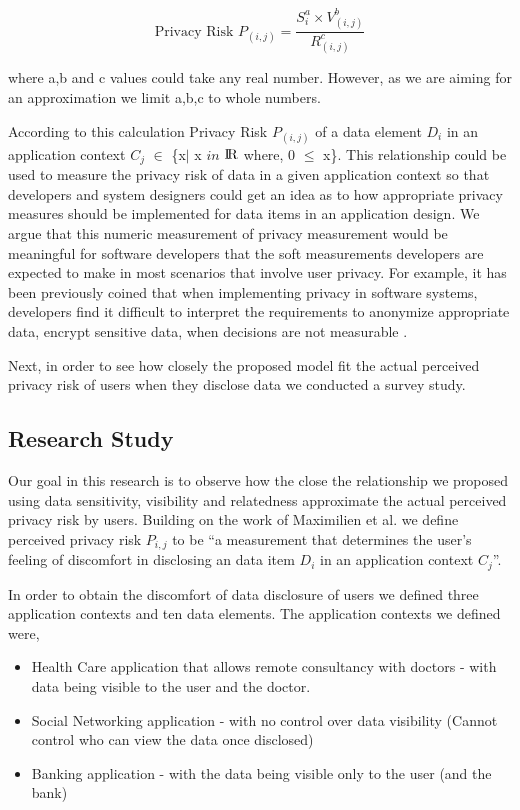 \documentclass[10pt]{article}
\begin{document}
\[
\text {Privacy Risk $P_{(i,j)}$} =\frac{S_{i}^a \times V_{(i,j)}^b}{R_{(i,j)}^ c}
\]

where a,b and c values could take any real number. However, as we are aiming for an approximation we limit a,b,c to whole numbers.

According to this calculation Privacy Risk $P_{(i,j)}$  of a data element \textit {$D_i$} in an application context \textit {$C_j$} $\in$ \{x$\mid$ x $in$ ${\rm I\!R}$ where, 0 $\leq$ x\}. This relationship could be used to measure the privacy risk of data in a given application context so that developers and system designers could get an idea as to how appropriate privacy measures should be implemented for data items in an application design. We argue that this numeric measurement of privacy measurement would be meaningful for software developers that the soft measurements developers are expected to make in most scenarios that involve user privacy. For example, it has been previously coined that when implementing privacy in software systems, developers find it difficult to interpret the requirements to anonymize appropriate data, encrypt sensitive data, when decisions are not measurable \cite {senarath2018why}. 



Next, in order to see how closely the proposed model fit the actual perceived privacy risk of users when they disclose data we conducted a survey study.

\subsection {Research Study}

Our goal in this research is to observe how the close the relationship we proposed using data sensitivity, visibility and relatedness approximate the actual perceived privacy risk by users. Building on the work of Maximilien et al. \cite {maximilien2009privacy} we define perceived privacy risk $P_{i,j}$ to be \enquote{a measurement that determines the user's feeling of discomfort in disclosing an data item \textit {$D_i$} in an application context \textit {$C_j$}}. 

In order to obtain the discomfort of data disclosure of users we defined three application contexts and ten data elements. The application contexts we defined were,

\begin{itemize}
\item Health Care application that allows remote consultancy with doctors - with data being visible to the user and the doctor.
\item Social Networking application - with no control over data visibility (Cannot control who can view the data once disclosed)
\item Banking application - with the data being visible only to the user (and the bank)
\end{itemize}
\end{document}
